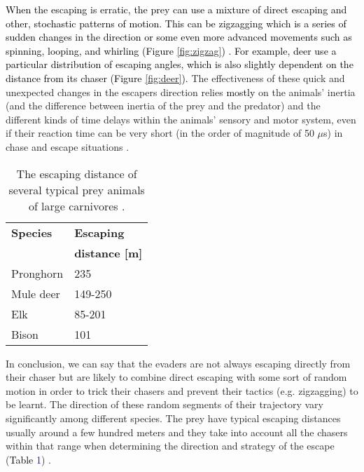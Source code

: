 \documentclass[12pt,a4paper,final]{iopart}
\newcommand{\revision}{\textcolor{black}}
\newcommand{\revisiontwo}{\textcolor{black}}
\begin{document}
\revisiontwo{When the escaping is erratic, the prey can use a mixture of direct escaping and other, stochastic patterns of motion. This can be zigzagging which is a series of sudden changes in the direction or some even more advanced movements such as spinning, looping, and whirling (Figure \ref{fig:zigzag}) \cite{humphries1970protean, edut2004protean}.  For example, deer use a particular  distribution of escaping angles, which is also slightly dependent on the distance from its chaser (Figure \ref{fig:deer}).}
The effectiveness of these quick and unexpected changes in the escapers direction relies \revisiontwo{mostly} on the animals' inertia (and the difference between inertia of the prey and the predator) and the different kinds of time delays within the animals' sensory and motor system, even if their reaction time can be very short (in the order of magnitude of 50 $\mu$s) in chase and escape situations \cite{eaton2013neural}. 

\begin{table}
\centering
\label{table:table2}
\begin{tabular}{@{}ll@{}}
\textbf{Species} & \textbf{Escaping } \\
\textbf{} & \textbf{distance {[}m{]}} \\
\hline
Pronghorn & 235 \\
Mule deer & 149-250 \\
Elk & 85-201 \\
Bison & 101 \\ 
\end{tabular}
\caption{The escaping distance of several typical prey animals of large carnivores \cite{bentrup2008conservation}. }
\end{table}

In conclusion, we can say that the evaders are not always escaping directly from their chaser but are likely to combine direct escaping with some sort of random motion in order to trick their chasers and prevent their tactics (e.g. zigzagging) to be learnt. The direction of these random segments of their trajectory vary significantly among different species. The prey have typical escaping distances usually around a few hundred meters and they take into account all the chasers within that range when determining the direction and strategy of the escape (\revision{Table} \textcolor{blue}{1}) \cite{domenici2011animal2, bentrup2008conservation, cooper1997escape}.
\end{document}
